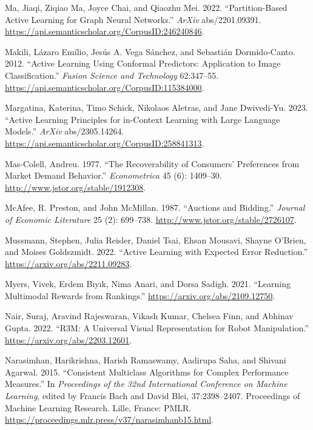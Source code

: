 \documentclass[
  letterpaper,
  numbers=noenddot,
  DIV=11,
  oneside]{scrreprt}
\newlength{\cslhangindent}
\newenvironment{CSLReferences}[2] %
 {\begin{list}{}{%
  \setlength{\itemindent}{0pt}
  \setlength{\leftmargin}{0pt}
  \setlength{\parsep}{0pt}
  \ifodd #1
   \setlength{\leftmargin}{\cslhangindent}
   \setlength{\itemindent}{-1\cslhangindent}
  \fi
  \setlength{\itemsep}{#2\baselineskip}}}
 {\end{list}}
\theoremstyle{remark}
\begin{document}
\begin{CSLReferences}{1}{0}
Ma, Jiaqi, Ziqiao Ma, Joyce Chai, and Qiaozhu Mei. 2022.
{``Partition-Based Active Learning for Graph Neural Networks.''}
\emph{ArXiv} abs/2201.09391.
\url{https://api.semanticscholar.org/CorpusID:246240846}.

Makili, Lázaro Emílio, Jesús A. Vega Sánchez, and Sebastián
Dormido-Canto. 2012. {``Active Learning Using Conformal Predictors:
Application to Image Classification.''} \emph{Fusion Science and
Technology} 62:347--55.
\url{https://api.semanticscholar.org/CorpusID:115384000}.

Margatina, Katerina, Timo Schick, Nikolaos Aletras, and Jane Dwivedi-Yu.
2023. {``Active Learning Principles for in-Context Learning with Large
Language Models.''} \emph{ArXiv} abs/2305.14264.
\url{https://api.semanticscholar.org/CorpusID:258841313}.

Mas-Colell, Andreu. 1977. {``The Recoverability of Consumers'
Preferences from Market Demand Behavior.''} \emph{Econometrica} 45 (6):
1409--30. \url{http://www.jstor.org/stable/1912308}.

McAfee, R. Preston, and John McMillan. 1987. {``Auctions and Bidding.''}
\emph{Journal of Economic Literature} 25 (2): 699--738.
\url{http://www.jstor.org/stable/2726107}.

Mussmann, Stephen, Julia Reisler, Daniel Tsai, Ehsan Mousavi, Shayne
O'Brien, and Moises Goldszmidt. 2022. {``Active Learning with Expected
Error Reduction.''} \url{https://arxiv.org/abs/2211.09283}.

Myers, Vivek, Erdem Bıyık, Nima Anari, and Dorsa Sadigh. 2021.
{``Learning Multimodal Rewards from Rankings.''}
\url{https://arxiv.org/abs/2109.12750}.

Nair, Suraj, Aravind Rajeswaran, Vikash Kumar, Chelsea Finn, and Abhinav
Gupta. 2022. {``R3M: A Universal Visual Representation for Robot
Manipulation.''} \url{https://arxiv.org/abs/2203.12601}.

Narasimhan, Harikrishna, Harish Ramaswamy, Aadirupa Saha, and Shivani
Agarwal. 2015. {``Consistent Multiclass Algorithms for Complex
Performance Measures.''} In \emph{Proceedings of the 32nd International
Conference on Machine Learning}, edited by Francis Bach and David Blei,
37:2398--2407. Proceedings of Machine Learning Research. Lille, France:
PMLR. \url{https://proceedings.mlr.press/v37/narasimhanb15.html}.


\end{CSLReferences}
\end{document}
